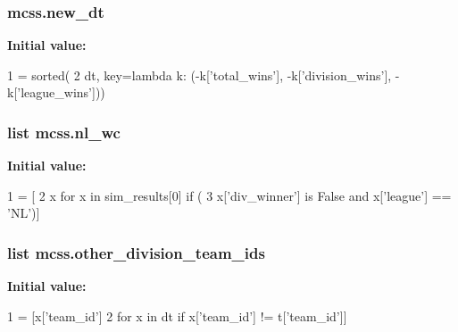 \subsubsection[{\texorpdfstring{new\+\_\+dt}{new_dt}}]{\setlength{\rightskip}{0pt plus 5cm}mcss.\+new\+\_\+dt}\hypertarget{namespacemcss_aeedb6bca27d8005d9dd359eb37632167}{}\label{namespacemcss_aeedb6bca27d8005d9dd359eb37632167}
{\bfseries Initial value\+:}
\begin{DoxyCode}
1 = sorted(
2                 dt, key=\textcolor{keyword}{lambda} k: (-k[\textcolor{stringliteral}{'total\_wins'}], -k[\textcolor{stringliteral}{'division\_wins'}], -k[\textcolor{stringliteral}{'league\_wins'}]))
\end{DoxyCode}
\subsubsection[{\texorpdfstring{nl\+\_\+wc}{nl_wc}}]{\setlength{\rightskip}{0pt plus 5cm}list mcss.\+nl\+\_\+wc}\hypertarget{namespacemcss_a91351d4c9aaef5a99d3cbddb7b7ba641}{}\label{namespacemcss_a91351d4c9aaef5a99d3cbddb7b7ba641}
{\bfseries Initial value\+:}
\begin{DoxyCode}
1 = [
2             x \textcolor{keywordflow}{for} x \textcolor{keywordflow}{in} sim\_results[0] \textcolor{keywordflow}{if} (
3                 x[\textcolor{stringliteral}{'div\_winner'}] \textcolor{keywordflow}{is} \textcolor{keyword}{False} \textcolor{keywordflow}{and} x[\textcolor{stringliteral}{'league'}] == \textcolor{stringliteral}{'NL'})]
\end{DoxyCode}
\subsubsection[{\texorpdfstring{other\+\_\+division\+\_\+team\+\_\+ids}{other_division_team_ids}}]{\setlength{\rightskip}{0pt plus 5cm}list mcss.\+other\+\_\+division\+\_\+team\+\_\+ids}\hypertarget{namespacemcss_a34f37c5a402c79f9852c87b7570304c9}{}\label{namespacemcss_a34f37c5a402c79f9852c87b7570304c9}
{\bfseries Initial value\+:}
\begin{DoxyCode}
1 = [x[\textcolor{stringliteral}{'team\_id'}]
2                                            \textcolor{keywordflow}{for} x \textcolor{keywordflow}{in} dt \textcolor{keywordflow}{if} x[\textcolor{stringliteral}{'team\_id'}] != t[\textcolor{stringliteral}{'team\_id'}]]
\end{DoxyCode}
